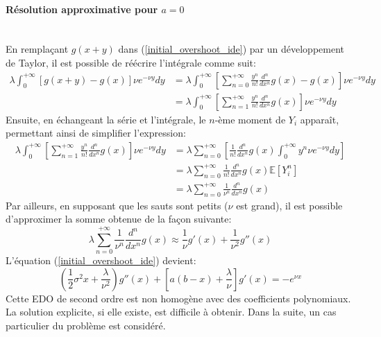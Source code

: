 \paragraph{Résolution approximative pour $a=0$}\phantom{}\\
En remplaçant $g(x+y)$ dans (\ref{initial_overshoot_ide}) par un développement de Taylor, il est possible de réécrire l'intégrale comme suit:
\[
\begin{aligned}
    \lambda\int_0^{+\infty}\left[g(x+y)-g(x)\right]\nu e^{-\nu y}dy&=\lambda\int_0^{+\infty}\left[\sum_{n=0}^{+\infty}\frac{y^n}{n!}\frac{d^n}{dx^n}g(x)-g(x)\right]\nu e^{-\nu y}dy\\
    &=\lambda\int_0^{+\infty}\left[\sum_{n=1}^{+\infty}\frac{y^n}{n!}\frac{d^n}{dx^n}g(x)\right]\nu e^{-\nu y}dy
\end{aligned}
\]
Ensuite, en échangeant la série et l'intégrale, le $n$-ème moment de $Y_i$ apparaît, permettant ainsi de simplifier l'expression:
\[
\begin{aligned}
    \lambda\int_0^{+\infty}\left[\sum_{n=1}^{+\infty}\frac{y^n}{n!}\frac{d^n}{dx^n}g(x)\right]\nu e^{-\nu y}dy&=\lambda\sum_{n=0}^{+\infty}\left[\frac{1}{n!}\frac{d^n}{dx^n}g(x)\int_0^{+\infty}y^n\nu e^{-\nu y}dy\right]\\
    &=\lambda\sum_{n=0}^{+\infty}\frac{1}{n!}\frac{d^n}{dx^n}g(x)\mathds{E}\left[Y_i^n\right]\\
    &=\lambda\sum_{n=0}^{+\infty}\frac{1}{\nu^n}\frac{d^n}{dx^n}g(x)
\end{aligned}
\]
Par ailleurs, en supposant que les sauts sont petits ($\nu$ est grand), il est possible d'approximer la somme obtenue de la façon suivante:
\[
\lambda\sum_{n=0}^{+\infty}\frac{1}{\nu^n}\frac{d^n}{dx^n}g(x)\approx\frac{1}{\nu}g'(x)+\frac{1}{\nu^2}g''(x)
\]
L'équation (\ref{initial_overshoot_ide}) devient:
\begin{equation}\label{final_overshoot_ode}
    \left(\frac{1}{2}\sigma^2x+\frac{\lambda}{\nu^2}\right)g''(x)+\left[a(b-x)+\frac{\lambda}{\nu}\right]g'(x) =-e^{\nu x}
\end{equation}
Cette \acs{EDO} de second ordre est non homogène avec des coefficients polynomiaux. La solution explicite, si elle existe, est difficile à obtenir. Dans la suite, un cas particulier du problème est considéré.

